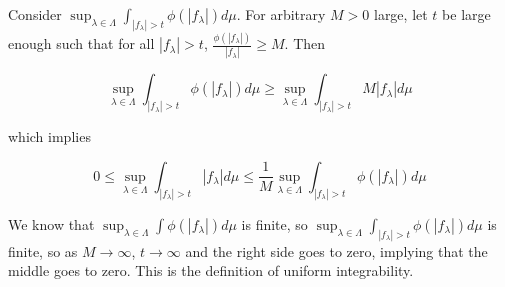 \documentclass{article}
\begin{document}
Consider $\sup_{\lambda \in \Lambda} \int_{|f_\lambda|>t} \phi(|f_\lambda|)d\mu$. For arbitrary $M>0$ large, let $t$ be large enough such that for all $|f_\lambda| > t$, $\frac{\phi(|f_\lambda|)}{|f_\lambda|} \geq M$. Then

\[
\sup_{\lambda \in \Lambda} \int_{|f_\lambda|>t} \phi(|f_\lambda|)d\mu \geq \sup_{\lambda \in \Lambda} \int_{|f_\lambda|>t}M|f_\lambda| d\mu
\]

which implies

\[
0 \leq \sup_{\lambda \in \Lambda} \int_{|f_\lambda|>t}|f_\lambda| d\mu \leq \frac{1}{M}\sup_{\lambda \in \Lambda} \int_{|f_\lambda|>t} \phi(|f_\lambda|)d\mu
\]

We know that $\sup_{\lambda \in \Lambda} \int \phi(|f_\lambda|)d\mu$ is finite, so $\sup_{\lambda \in \Lambda} \int_{|f_\lambda|>t} \phi(|f_\lambda|)d\mu$ is finite, so as $M \rightarrow \infty$, $t \rightarrow \infty$ and the right side goes to zero, implying that the middle goes to zero. This is the definition of uniform integrability.
\end{document}
